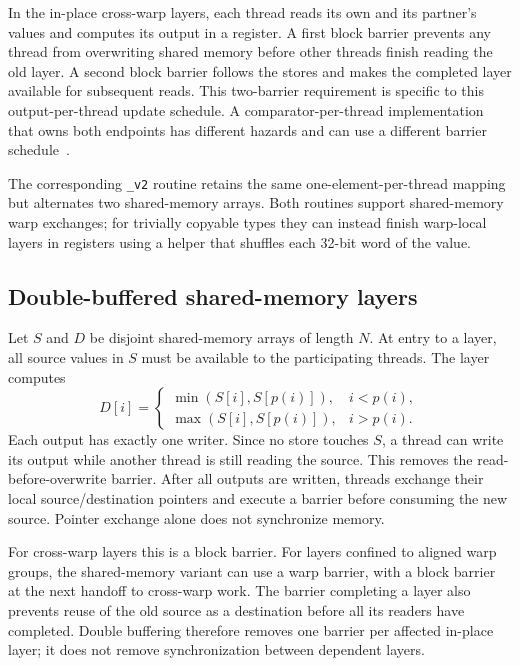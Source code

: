 \documentclass[fleqn,10pt,lineno]{wlpeerj}
\begin{document}
In the in-place cross-warp layers, each thread reads its own and its partner's values and computes its output in a register. A first block barrier prevents any thread from overwriting shared memory before other threads finish reading the old layer. A second block barrier follows the stores and makes the completed layer available for subsequent reads. This two-barrier requirement is specific to this output-per-thread update schedule. A comparator-per-thread implementation that owns both endpoints has different hazards and can use a different barrier schedule~\citep{nvidiaSortingNetworks}.

The corresponding \texttt{\_v2} routine retains the same one-element-per-thread mapping but alternates two shared-memory arrays. Both routines support shared-memory warp exchanges; for trivially copyable types they can instead finish warp-local layers in registers using a helper that shuffles each 32-bit word of the value.

\subsection*{Double-buffered shared-memory layers}
\label{sec:buffers}
Let $S$ and $D$ be disjoint shared-memory arrays of length $N$. At entry to a layer, all source values in $S$ must be available to the participating threads. The layer computes
\begin{equation}
 D[i]=\begin{cases}
 \min(S[i],S[p(i)]),&i<p(i),\\
 \max(S[i],S[p(i)]),&i>p(i).
 \end{cases}
\label{eq:layer}
\end{equation}
Each output has exactly one writer. Since no store touches $S$, a thread can write its output while another thread is still reading the source. This removes the read-before-overwrite barrier. After all outputs are written, threads exchange their local source/destination pointers and execute a barrier before consuming the new source. Pointer exchange alone does not synchronize memory.

For cross-warp layers this is a block barrier. For layers confined to aligned warp groups, the shared-memory variant can use a warp barrier, with a block barrier at the next handoff to cross-warp work. The barrier completing a layer also prevents reuse of the old source as a destination before all its readers have completed. Double buffering therefore removes one barrier per affected in-place layer; it does not remove synchronization between dependent layers.
\end{document}
